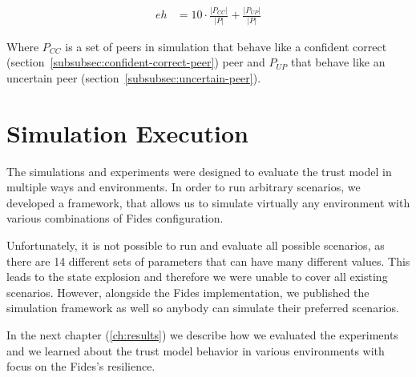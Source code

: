 \begin{equation}
    \begin{split}
    eh &= 10 \cdot \frac{|P_{CC}|}{|P|} + \frac{|P_{UP}|}{|P|}
    \end{split}
    \label{eq:environment_hardness}
\end{equation}

\noindent
Where $P_{CC}$ is a set of peers in simulation that behave like a confident correct (section~\ref{subsubsec:confident-correct-peer}) peer and $P_{UP}$ that behave like an uncertain peer (section~\ref{subsubsec:uncertain-peer}).

\section{Simulation Execution}
\label{sec:simulations-execution}
The simulations and experiments were designed to evaluate the trust model in multiple ways and environments.
In order to run arbitrary scenarios, we developed a framework, that allows us to simulate virtually any environment with various combinations of Fides configuration.

Unfortunately, it is not possible to run and evaluate all possible scenarios, as there are 14 different sets of parameters that can have many different values.
This leads to the state explosion and therefore we were unable to cover all existing scenarios. 
However, alongside the Fides implementation, we published the simulation framework as well so anybody can simulate their preferred scenarios.

In the next chapter (\ref{ch:results}) we describe how we evaluated the experiments and we learned about the trust model behavior in various environments with focus on the Fides's resilience.
